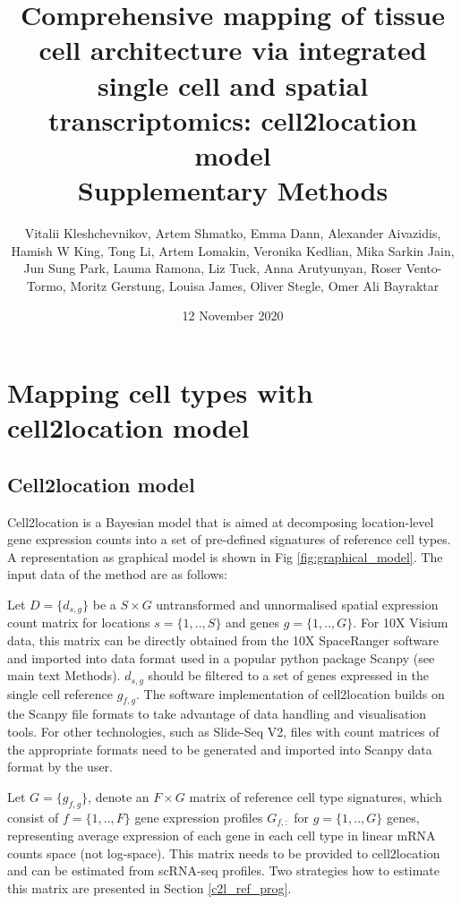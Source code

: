 \documentclass[11pt,a4paper]{article}
\title{Comprehensive mapping of tissue cell architecture via integrated single cell and spatial transcriptomics: cell2location model \\
Supplementary Methods
}
\author{Vitalii Kleshchevnikov, Artem Shmatko, Emma Dann, Alexander Aivazidis, Hamish W King, Tong Li, Artem Lomakin, Veronika Kedlian, Mika Sarkin Jain, Jun Sung Park, Lauma Ramona, Liz Tuck, Anna Arutyunyan, Roser Vento-Tormo, Moritz Gerstung, Louisa James, Oliver Stegle, Omer Ali Bayraktar}
\date{12 November 2020}
\begin{document}
\maketitle

\tableofcontents

\section{Mapping cell types with cell2location model}

\subsection{Cell2location model} \label{cell2location_model}

Cell2location is a Bayesian model that is aimed at decomposing location-level gene expression counts into a set of pre-defined signatures of reference cell types. A representation as graphical model is shown in Fig \ref{fig:graphical_model}. The input data of the method are as follows: \newline

Let $D=\{d_{s,g}\}$ be a $S \times G$ untransformed and unnormalised spatial expression count matrix for locations $s=\{1,..,S\}$ and genes $g=\{1,..,G\}$. For 10X Visium data, this matrix can be directly obtained from the 10X SpaceRanger software and imported into data format used in a popular python package Scanpy \autocite{wolf_scanpy_2018} (see main text Methods). $d_{s,g}$ should be filtered to a set of genes expressed in the single cell reference $g_{f,g}$. The software implementation of cell2location builds on the Scanpy file formats to take advantage of data handling and visualisation tools. For other technologies, such as Slide-Seq V2, files with count matrices of the appropriate formats need to be generated and imported into Scanpy data format by the user. \newline

Let $G=\{g_{f,g}\}$, denote an $F \times G$ matrix of reference cell type signatures, which consist of $f=\{1,..,F\}$ gene expression profiles $G_{f,:}$ for $g=\{1,..,G\}$ genes, representing average expression of each gene in each cell type in linear mRNA counts space (not log-space). This matrix needs to be provided to cell2location and can be estimated from scRNA-seq profiles. Two strategies how to estimate this matrix are presented in Section \ref{c2l_ref_prog}. \newline
\end{document}
